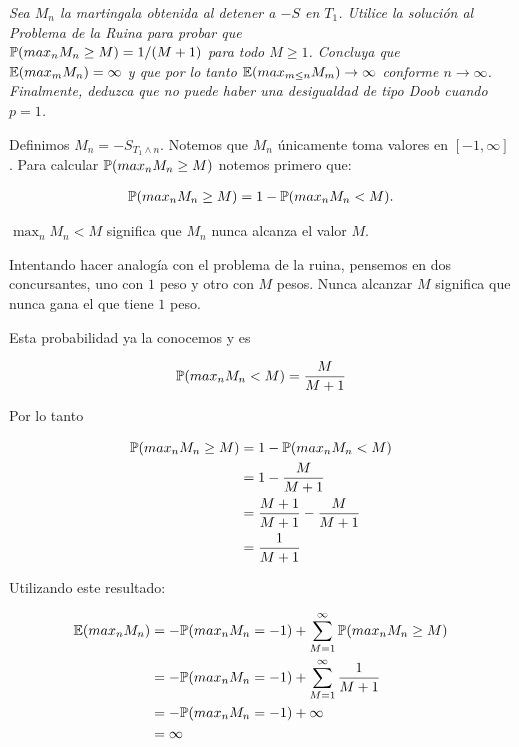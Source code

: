 \emph{
	Sea $M_n$ la martingala obtenida al detener a $-S$ en $T_1$. Utilice la solución al
	Problema de la Ruina para probar que \\
	$\mathbb{P}(max_n M_n \geq M) = 1/(M+1)$ para todo $M \geq 1$. Concluya que\\
	$\mathbb{E}(max_m M_n) = \infty$ y que por lo tanto $\mathbb{E}(max_{m\leq n} M_m) \rightarrow \infty$ conforme 
	$n \rightarrow \infty$. Finalmente, deduzca que no puede haber una desigualdad de tipo Doob cuando $p=1$.
}\pn
	
\afterstatement

	Definimos $M_n = -S_{T_1 \wedge n}$. Notemos que $M_n$ únicamente toma valores en $[-1, \infty]$.
	Para calcular $\mathbb{P}(max_n M_n \geq M)$ notemos primero que:

	\begin{align}
		\mathbb{P}(max_n M_n \geq M) = 1 - \mathbb{P}(max_n M_n < M).
	\end{align}\pn
	
	$\max_n M_n < M$ significa que $M_n$ nunca alcanza el valor $M$.\pn
	 
	Intentando hacer analogía con el problema de la ruina, pensemos en dos concursantes,
	uno con $1$ peso y otro con $M$ pesos. Nunca alcanzar $M$ significa que nunca gana el que tiene $1$ peso.\pn
	
	Esta probabilidad ya la conocemos y es 
	
	\begin{align}
		\mathbb{P}(max_n M_n < M) = \frac{M}{M + 1}
	\end{align}\pn
		
	Por lo tanto
	
	\begin{align}
		\mathbb{P}(max_n M_n \geq M) 	&= 1 - \mathbb{P}(max_n M_n < M) \\
								&= 1 - \frac{M}{M + 1}\\
								&= \frac{M+1}{M+1} - \frac{M}{M + 1}\\
								&= \frac{1}{M+1}
	\end{align}\pn
	
	Utilizando este resultado:

	\begin{align} \label{problema1_3:esperanza_del_maximo_de_M_n}
		\mathbb{E}(max_n M_n) 	&= - \mathbb{P}(max_n M_n = -1) + \sum_{M=1}^{\infty} \mathbb{P}(max_n M_n \geq M) \\
						&= - \mathbb{P}(max_n M_n = -1) + \sum_{M=1}^{\infty} \frac{1}{M+1} \\ 
						&= - \mathbb{P}(max_n M_n = -1) + \infty \\
						&= \infty
	\end{align}\pn						
	
